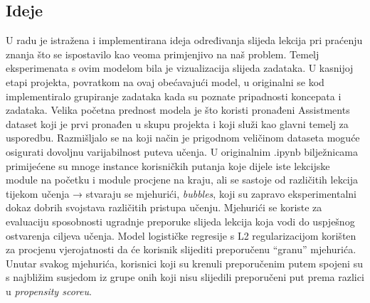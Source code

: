\subsection{Ideje}
U radu je istražena i implementirana ideja određivanja slijeda lekcija pri praćenju znanja što se ispostavilo kao veoma primjenjivo na naš problem. Temelj eksperimenata s ovim modelom bila je vizualizacija slijeda zadataka. U kasnijoj etapi projekta, povratkom na ovaj obećavajući model, u originalni se kod implementiralo grupiranje zadataka kada su poznate pripadnosti koncepata i zadataka. Velika početna prednost modela je što koristi pronađeni Assistments dataset koji je prvi pronađen u skupu projekta i koji služi kao glavni temelj za usporedbu. Razmišljalo se na koji način je prigodnom veličinom dataseta moguće osigurati dovoljnu varijabilnost puteva učenja. \newline
U originalnim .ipynb bilježnicama primijećene su mnoge instance korisničkih putanja koje dijele iste lekcijske module na početku i module procjene na kraju, ali se sastoje od različitih lekcija tijekom učenja → stvaraju se mjehurići, \textit{bubbles}, koji su zapravo eksperimentalni dokaz dobrih svojstava različitih pristupa učenju. Mjehurići se koriste za evaluaciju sposobnosti ugradnje preporuke slijeda lekcija koja vodi do uspješnog ostvarenja ciljeva učenja. Model logističke regresije s L2 regularizacijom korišten za procjenu vjerojatnosti da će korisnik slijediti preporučenu “granu” mjehurića. Unutar svakog mjehurića, korisnici koji su krenuli preporučenim putem spojeni su s najbližim susjedom iz grupe onih koji nisu slijedili preporučeni put prema razlici u \textit{propensity scoreu}.

